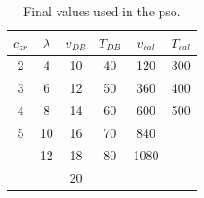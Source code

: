 \begin{table}[ht!]
	\centering
	\caption{Final values used in the \gls{pso}.}
    \label{tab:space}
    \begin{tabular}{cccccc}
        \hline\hline
		$c_{zr}$	&$\lambda$	&$v_{DB}$	&$T_{DB}$	&$v_{cal}$	&$T_{cal}$		\\
        \hline
        2   &4  &10 &40 &120    &300    \\
        3   &6  &12 &50 &360    &400    \\
        4   &8  &14 &60 &600    &500    \\
        5   &10 &16 &70 &840    &       \\
            &12 &18 &80 &1080   &       \\
            &   &20 &   &       &       \\
        \hline\hline
    \end{tabular}
\end{table}
\fi


